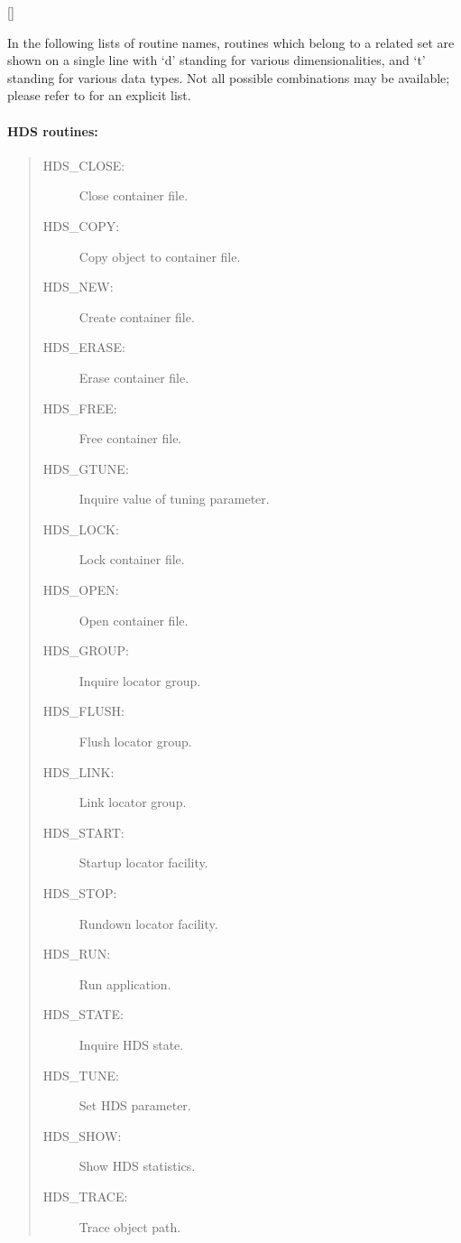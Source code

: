 \vspace{-9mm}

\hfill []

\vspace{2mm}

In the following lists of routine names, routines which belong to a related
set are shown on a single line with `d' standing for various dimensionalities,
and `t' standing for various data types.
Not all possible combinations may be available; please refer to
 for an explicit list.

\paragraph{HDS routines:}

\begin{quote}
\begin{description}
\item [HDS\_CLOSE:]  Close container file.
\item [HDS\_COPY:]  Copy object to container file.
\item [HDS\_NEW:]  Create container file.
\item [HDS\_ERASE:]  Erase container file.
\item [HDS\_FREE:]  Free container file.
\item [HDS\_GTUNE:]  Inquire value of tuning parameter.
\item [HDS\_LOCK:]  Lock container file.
\item [HDS\_OPEN:]  Open container file.
\item [HDS\_GROUP:]  Inquire locator group.
\item [HDS\_FLUSH:]  Flush locator group.
\item [HDS\_LINK:]  Link locator group.
\item [HDS\_START:]  Startup locator facility.
\item [HDS\_STOP:]  Rundown locator facility.
\item [HDS\_RUN:]  Run application.
\item [HDS\_STATE:]  Inquire HDS state.
\item [HDS\_TUNE:]  Set HDS parameter.
\item [HDS\_SHOW:]  Show HDS statistics.
\item [HDS\_TRACE:]  Trace object path.
\end{description}
\end{quote}

\vspace*{5mm}

